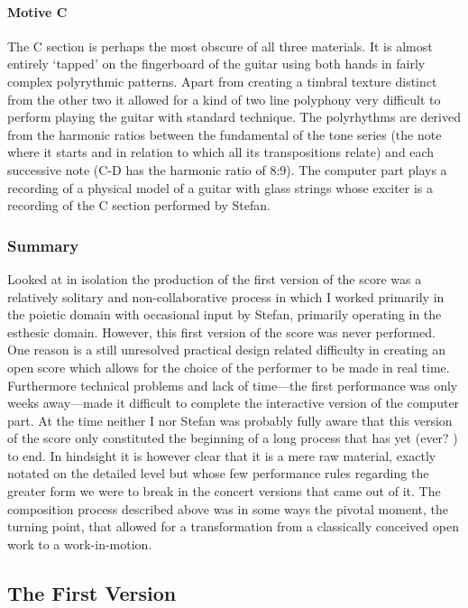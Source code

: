 \paragraph{Motive C }
\label{sec:motive-c-}

The C section is perhaps the most obscure of all three materials. It
is almost entirely `tapped' on the fingerboard of the guitar using
both hands in fairly complex polyrythmic patterns. Apart from creating
a timbral texture distinct from the other two it allowed for a kind of
two line polyphony very difficult to perform playing the guitar with
standard technique. The polyrhythms are derived from the harmonic
ratios between the fundamental of the tone series (the note where it
starts and in relation to which all its transpositions relate) and
each successive note (C-D has the harmonic ratio of 8:9). The computer
part plays a recording of a physical model of a guitar with glass
strings whose exciter is a recording of the C section performed by
Stefan.

\subsubsection{Summary }
\label{sec:summary-}

Looked at in isolation the production of the first version of the
score was a relatively solitary and non-collaborative process in which
I worked primarily in the poietic domain with occasional input by
Stefan, primarily operating in the esthesic domain. However, this
first version of the score was never performed. One reason is a still
unresolved practical design related difficulty in creating an open
score which allows for the choice of the performer to be made in real
time. Furthermore technical problems and lack of time---the first
performance was only weeks away---made it difficult to complete the
interactive version of the computer part. At the time neither I nor
Stefan was probably fully aware that this version of the score only
constituted the beginning of a long process that has yet (ever? ) to
end. In hindsight it is however clear that it is a mere raw material,
exactly notated on the detailed level but whose few performance rules
regarding the greater form we were to break in the concert versions
that came out of it. The composition process described above was in
some ways the pivotal moment, the turning point, that allowed for a
transformation from a classically conceived open work to a
work-in-motion.

\subsection{The First Version }
\label{sec:first-version-}

